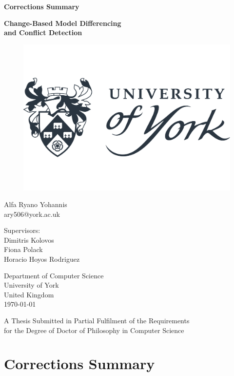 \documentclass[11pt, a4paper]{report}
\begin{document}
  

  \begin{titlepage}
  \begin{center}
    
    \textbf{\Large Corrections Summary}
    
    \vfill
    
    \textbf{\Large Change-Based Model Differencing\\and Conflict Detection}
    
    \vfill
    \begin{figure}[ht]
      \centering
      \includegraphics[width=0.5\linewidth]{../images/uoy}
      \label{fig:uoy}
    \end{figure}
    \vfill
    
    Alfa Ryano Yohannis\\
    ary506@york.ac.uk
    
    \vspace{1cm}
    
    Supervisors:\\
    Dimitris Kolovos\\
    Fiona Polack\\
    Horacio Hoyos Rodriguez
    \vspace{1cm}
    
    Department of Computer Science\\
    University of York\\
    United Kingdom\\
    \vspace{1cm}
    \today
    
    \vfill
    A Thesis Submitted in Partial Fulfilment of the Requirements\\
    for the Degree of Doctor of Philosophy in Computer Science
    
  \end{center}
\end{titlepage}

\chapter*{Corrections Summary}
\end{document}
